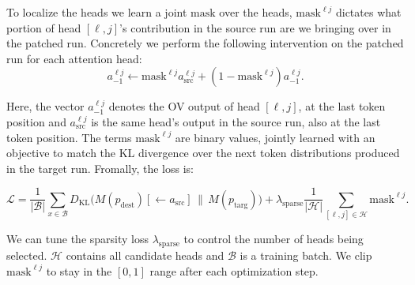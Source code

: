 To localize the heads we learn a joint $\mathrm{mask}$ over the heads, $\mathrm{mask}^{\ell j}$ dictates what portion of head $[\ell, j]$'s contribution in the source run are we bringing over in the patched run. Concretely we perform the following intervention on the patched run for each attention head:
\begin{equation}
a_{-1}^{\ell j}\leftarrow \mathrm{mask}^{\ell j}a_{\mathrm{src}}^{\ell j}+(1-\mathrm{mask}^{\ell j})a_{-1}^{\ell j}.
\label{eqn:opt-int-app}
\end{equation}

Here, the vector $a_{-1}^{\ell j}$ denotes the OV output of head $[\ell, j]$, at the last token position and $a_\mathrm{src}^{\ell j}$ is the same head's output in the source run, also at the last token position. The terms $\mathrm{mask}^{\ell j}$ are binary values, jointly learned with an objective to match the KL divergence over the next token distributions produced in the target run. Fromally, the loss is:

\begin{equation}
\mathcal{L}=\frac{1}{|\mathcal{B}|}\sum_{x\in\mathcal{B}}
D_{\mathrm{KL}}\!\bigg(M\left(p_\mathrm{dest}\right)\left[\leftarrow a_\mathrm{src}\right]\,\|\, M\left(p_\mathrm{targ}\right) \bigg)
+\lambda_{\mathrm{sparse}}\frac{1}{|\mathcal{H}|}\sum_{[\ell, j]\in\mathcal{H}}\mathrm{mask}^{\ell j}.
\end{equation}

We can tune the sparsity loss $\lambda_\mathrm{sparse}$ to control the number of heads being selected. $\mathcal{H}$ contains all candidate heads and $\mathcal{B}$ is a training batch. We clip $\mathrm{mask}^{\ell j}$ to stay in the $[0, 1]$ range after each optimization step.
 




